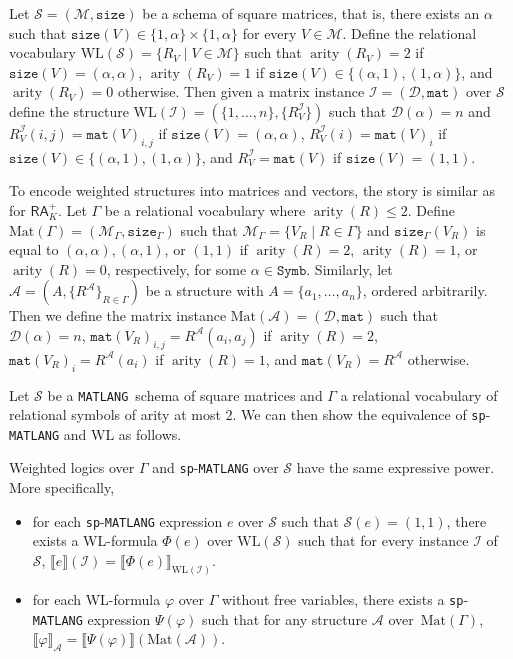 \documentclass[sigconf]{acmart}
\newcommand{\sem}[2]{\llbracket #1 \rrbracket(#2)}
\newcommand{\Mnam}{\mathcal{M}}
\newcommand{\I}{\mathcal{I}}
\newcommand{\Sch}{\mathcal{S}}
\newcommand{\dom}{\mathcal{D}}
\newcommand{\conc}{\texttt{mat}}
\newcommand{\DD}{\texttt{Symb}}
\newcommand{\size}{\texttt{size}}
\newcommand{\lang}{\texttt{MATLANG}\xspace}
\newcommand{\langprod}{\texttt{sp}-\texttt{MATLANG}\xspace}
\newcommand{\ssem}[2]{\llbracket #1 \rrbracket_{#2}}
\newcommand{\cA}{\mathcal{A}}
\newcommand{\arity}{\operatorname{arity}}
\begin{document}
Let $\Sch=(\Mnam,\size)$ be a schema of square matrices, that is, there exists an $\alpha$ such that $\size(V) \in \{1, \alpha\} \times \{1,\alpha\}$ for every $V \in \Mnam$.
Define the relational vocabulary $\text{WL}(\Sch) = \{R_V \mid V \in \Mnam\}$ such that $\arity(R_V) = 2$ if $\size(V) = (\alpha, \alpha)$, $\arity(R_V) = 1$ if $\size(V) \in \{(\alpha,1), (1,\alpha)\}$, and $\arity(R_V) = 0$ otherwise.
Then given a matrix instance $\I = (\dom,\conc)$ over $\Sch$ define the structure $\text{WL}(\I) = (\{1, \ldots, n\}, \{R_V^{\I}\} )$ such that $\dom(\alpha) = n$ and $R_V^{\I}(i, j) = \conc(V)_{i,j}$ if $\size(V) = (\alpha, \alpha)$, $R_V^{\I}(i) = \conc(V)_{i}$ if $\size(V) \in \{(\alpha,1), (1,\alpha)\}$, and $R_V^{\I} = \conc(V)$ if $\size(V) = (1,1)$.

To encode weighted structures into matrices and vectors, the story is similar as for $\mathsf{RA}_K^+$. Let $\Gamma$ be a relational vocabulary where $\arity(R) \leq 2$. 
Define $\text{Mat}(\Gamma) = (\Mnam_\Gamma,\size_\Gamma)$ such that $\Mnam_\Gamma = \{ V_{R} \mid R \in \Gamma\}$ and $\size_\Gamma(V_{R})$ is equal to $(\alpha, \alpha), (\alpha, 1)$, or $(1,1)$ if $\arity(R)=2$, $\arity(R)=1$, or $\arity(R)=0$, respectively, for some $\alpha \in \DD$. Similarly, let $\cA = (A, \{R^{\cA}\}_{R \in \Gamma})$ be a structure with $A = \{a_1, \ldots, a_n\}$, ordered arbitrarily.
Then we define the matrix instance $\text{Mat}(\cA) = (\dom,\conc)$ such that $\dom(\alpha) = n$, $\conc(V_{R})_{i,j} = R^{\cA}(a_i, a_j)$ if $\arity(R)=2$, $\conc(V_{R})_{i} = R^{\cA}(a_i)$ if $\arity(R)=1$, and $\conc(V_{R}) = R^{\cA}$ otherwise.

Let $\Sch$ be a \lang\ schema of square matrices and $\Gamma$ a relational vocabulary of relational symbols of arity at most $2$. We can then show the equivalence of \langprod and WL as follows. 
\begin{proposition} \label{prop:wl}
Weighted logics over $\Gamma$ and \langprod over $\Sch$ have the same expressive power. More specifically,
\begin{itemize}
	\item for each \langprod expression $e$ over $\Sch$ such that $\Sch(e)=(1,1)$, there exists a WL-formula $\Phi(e)$ over $\text{WL}(\Sch)$ such that for every instance $\I$ of~$\Sch$, 
	$
	\sem{e}{\I} = \ssem{\Phi(e)}{\text{WL}(\I)}
	$.
	\item for each WL-formula $\varphi$ over $\Gamma$ without free variables, there exists a \langprod expression $\Psi(\varphi)$ such that for any structure $\cA$ over~$\text{Mat}(\Gamma)$,
	$
	\ssem{\varphi}{\cA}=\sem{\Psi(\varphi)}{\text{Mat}(\cA)}
	$.
\end{itemize}	
\end{proposition}
\end{document}
